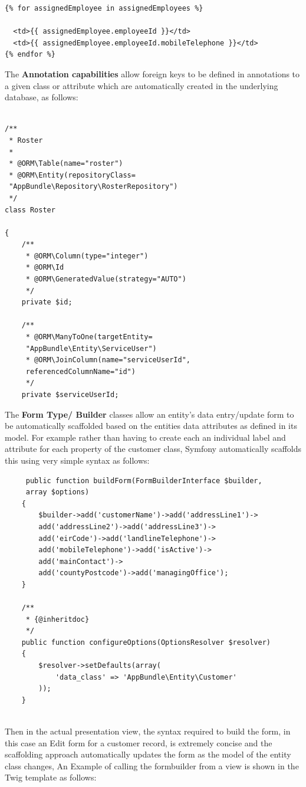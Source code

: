 \documentclass[a4paper,12pt]{article}
\begin{document}
\begin{verbatim}
{% for assignedEmployee in assignedEmployees %}

  <td>{{ assignedEmployee.employeeId }}</td>
  <td>{{ assignedEmployee.employeeId.mobileTelephone }}</td>
{% endfor %}
\end{verbatim}
The \textbf{Annotation capabilities} allow foreign keys to be defined in annotations to a given class or attribute which are automatically created in the underlying database, as follows:

 \begin{verbatim}

/**
 * Roster
 *
 * @ORM\Table(name="roster")
 * @ORM\Entity(repositoryClass=
 "AppBundle\Repository\RosterRepository")
 */
class Roster

{
    /**
     * @ORM\Column(type="integer")
     * @ORM\Id
     * @ORM\GeneratedValue(strategy="AUTO")
     */
    private $id;

    /**
     * @ORM\ManyToOne(targetEntity=
     "AppBundle\Entity\ServiceUser")
     * @ORM\JoinColumn(name="serviceUserId", 
     referencedColumnName="id")
     */
    private $serviceUserId;
\end{verbatim}
 
The \textbf{Form Type/ Builder} classes allow an entity's data entry/update form to be automatically scaffolded based on the entities data attributes as defined in its model. For example rather than having to create each an individual label and attribute for each property of the customer class, Symfony automatically scaffolds this using very simple syntax as follows:
 
 \begin{verbatim}
     public function buildForm(FormBuilderInterface $builder, 
     array $options)
    {
        $builder->add('customerName')->add('addressLine1')->
        add('addressLine2')->add('addressLine3')->
        add('eirCode')->add('landlineTelephone')->
        add('mobileTelephone')->add('isActive')->
        add('mainContact')->
        add('countyPostcode')->add('managingOffice');
    }

    /**
     * {@inheritdoc}
     */
    public function configureOptions(OptionsResolver $resolver)
    {
        $resolver->setDefaults(array(
            'data_class' => 'AppBundle\Entity\Customer'
        ));
    }
    
\end{verbatim}

Then in the actual presentation view, the syntax required to build the form, in this case an Edit form for a customer record, is extremely concise and the scaffolding approach automatically updates the form as the model of the entity class changes, An Example of calling the formbuilder from a view is shown in the Twig template as follows:
\end{document}

